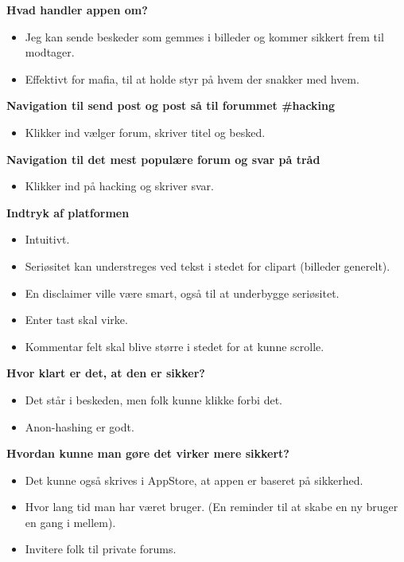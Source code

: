 \noindent\textbf{Hvad handler appen om?}
\begin{itemize}
    \item Jeg kan sende beskeder som gemmes i billeder og kommer sikkert frem til modtager.
    \item Effektivt for mafia, til at holde styr på hvem der snakker med hvem.
\end{itemize}

\noindent\textbf{Navigation til send post og post så til forummet \#hacking}
\begin{itemize}
    \item Klikker ind vælger forum, skriver titel og besked.
\end{itemize}

\noindent\textbf{Navigation til det mest populære forum og svar på tråd}
\begin{itemize}
    \item Klikker ind på hacking og skriver svar.
\end{itemize}

\noindent\textbf{Indtryk af platformen}
\begin{itemize}
    \item Intuitivt.
    \item Seriøsitet kan understreges ved tekst i stedet for clipart (billeder generelt).
    \item En disclaimer ville være smart, også til at underbygge seriøsitet.
    \item Enter tast skal virke.
    \item Kommentar felt skal blive større i stedet for at kunne scrolle.
\end{itemize}

\noindent\textbf{Hvor klart er det, at den er sikker?}
\begin{itemize}
    \item Det står i beskeden, men folk kunne klikke forbi det.
    \item Anon-hashing er godt.
\end{itemize}

\noindent\textbf{Hvordan kunne man gøre det virker mere sikkert?}
\begin{itemize}
    \item Det kunne også skrives i AppStore, at appen er baseret på sikkerhed.
    \item Hvor lang tid man har været bruger. (En reminder til at skabe en ny bruger en gang i mellem).
    \item Invitere folk til private forums.
\end{itemize}

